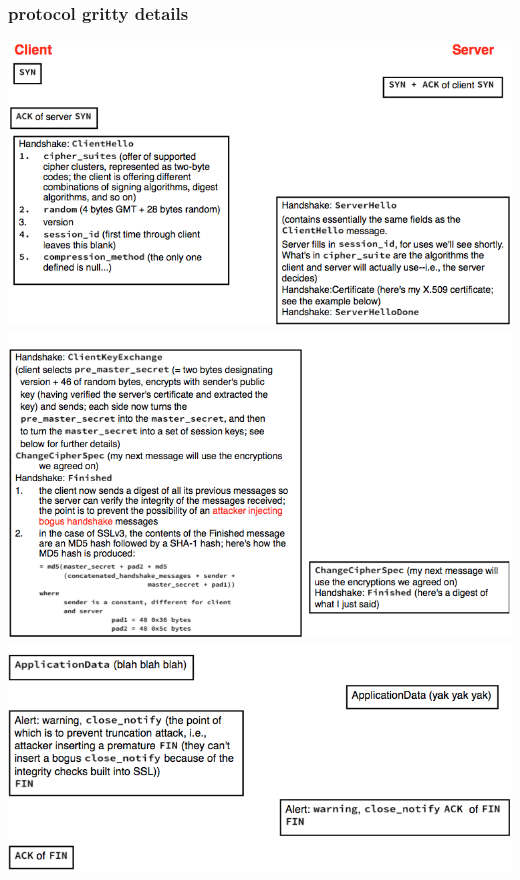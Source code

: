 \documentclass[10pt]{article}
\begin{document}
\subsubsection{protocol gritty details}
\begin{center}
	\includegraphics[scale=0.5]{handshake1.png}
	\includegraphics[scale=0.5]{handshake2.png}
	\includegraphics[scale=0.5]{handshake3.png}
\end{center}
\end{document}
